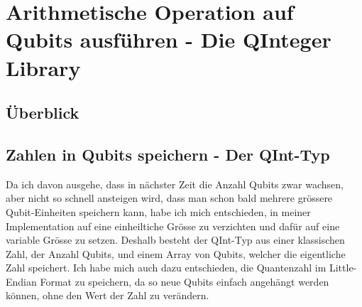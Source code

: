 \chapter{Arithmetische Operation auf Qubits ausführen - Die QInteger Library}
\section{Überblick}

\section{Zahlen in Qubits speichern - Der QInt-Typ}
Da ich davon ausgehe, dass in nächster Zeit die Anzahl Qubits zwar wachsen, aber nicht so schnell ansteigen wird, dass man schon bald mehrere grössere Qubit-Einheiten speichern kann, habe ich mich entschieden, in meiner Implementation auf eine einheiltiche Grösse zu verzichten und dafür auf eine variable Grösse zu setzen. Deshalb besteht der QInt-Typ aus einer klassischen Zahl, der Anzahl Qubits, und einem Array von Qubits, welcher die eigentliche Zahl speichert. Ich habe mich auch dazu entschieden, die Quantenzahl im Little-Endian Format zu speichern, da so neue Qubits einfach angehängt werden können, ohne den Wert der Zahl zu verändern. 



